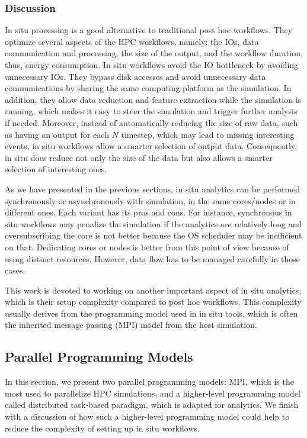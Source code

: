 \subsubsection{Discussion}
In situ processing is a good alternative to traditional post hoc workflows. They optimize several aspects of the HPC workflows, namely: the IOs, data communication and processing, the size of the output, and the workflow duration, thus, energy consumption.
In situ workflows avoid the IO bottleneck by avoiding unnecessary IOs. They bypass disk accesses and avoid unnecessary data communications by sharing the same computing platform as the simulation. 
In addition, they allow data reduction and feature extraction while the simulation is running, which makes it easy to steer the simulation and trigger further analysis if needed. Moreover, instead of automatically reducing the size of raw data, such as having an output for each $N$ timestep, which may lead to missing interesting events, in situ workflows allow a smarter selection of output data. Consequently, in situ does reduce not only the size of the data but also allows a smarter selection of interesting ones.

As we have presented in the previous sections, in situ analytics can be performed synchronously or asynchronously with simulation, in the same cores/nodes or in different ones. Each variant has its pros and cons. For instance, synchronous in situ workflows may penalize the simulation if the analytics are relatively long and oversubscribing the core is not better because the OS scheduler may be inefficient on that. Dedicating cores or nodes is better from this point of view because of using distinct resources. However, data flow has to be managed carefully in those cases. 

This work is devoted to working on another important aspect of in situ analytics, which is their setup complexity compared to post hoc workflows. 
This complexity usually derives from the programming model used in in situ tools, which is often the inherited message passing (MPI) model from the host simulation. 

\subsection{Parallel Programming Models}\label{sec:programmingmodel}

In this section, we present two parallel programming models: MPI, which is the most used to parallelize HPC simulations, and a higher-level programming model called distributed task-based paradigm, which is adapted for analytics. We finish with a discussion of how such  a higher-level programming model could help to reduce the complexity of setting up in situ workflows.

